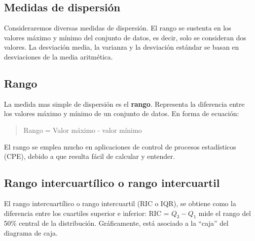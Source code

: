 \documentclass[]{article}
\begin{document}
\subsection{Medidas de dispersión}
Consideraremos diversas medidas de dispersión. El rango se sustenta en los valores máximo y mínimo del conjunto de datos, es decir, solo se consideran dos valores. La desviación media, la varianza y la desviación estándar se basan en desviaciones de la media aritmética.

\subsection*{Rango}
La medida mas simple de dispersión es el \textbf{rango}. Representa la diferencia entre los valores máximo y mínimo de un conjunto de datos. En forma de ecuación:
\begin{quote}
	\item Rango = Valor máximo - valor mínimo
\end{quote}
El rango se emplea mucho en aplicaciones de control de procesos estadísticos (CPE), debido a que resulta fácil de calcular y entender.
\subsection{Rango intercuartílico o rango intercuartil}
El rango intercuartílico o rango intercuartil (RIC o IQR), se obtiene como la diferencia entre los cuartiles superior e inferior: RIC = \textbf{$Q_{3} - Q_{1}$} mide el rango del 50\% central de la distribución. Gráficamente, está asociado a la “caja” del diagrama de caja.
\end{document}

